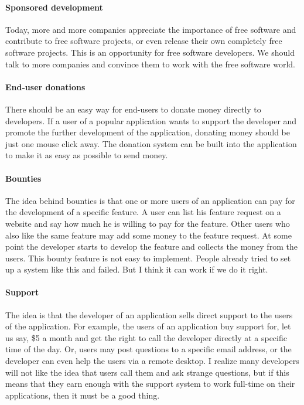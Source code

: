\paragraph*{Sponsored development}

Today, more and more companies appreciate the importance of free software and contribute to free software projects, or even release their own completely free software projects. This is an opportunity for free software developers. We should talk to more companies and convince them to work with the free software world. 

\paragraph*{End-user donations}

There should be an easy way for end-users to donate money directly to developers. If a user of a popular application wants to support the developer and promote the further development of the application, donating money should be just one mouse click away. The donation system can be built into the application to make it as easy as possible to send money.

\paragraph*{Bounties}

The idea behind bounties is that one or more users of an application can pay for the development of a specific feature. A user can list his feature request on a website and say how much he is willing to pay for the feature. Other users who also like the same feature may add some money to the feature request. At some point the developer starts to develop the feature and collects the money from the users. This bounty feature is not easy to implement. People already tried to set up a system like this and failed. But I think it can work if we do it right. 

\paragraph*{Support}

The idea is that the developer of an application sells direct support to the users of the application. For example, the users of an application buy support for, let us say, \$5 a month and get the right to call the developer directly at a specific time of the day. Or, users may post questions to a specific email address, or the developer can even help the users via a remote desktop. I realize many developers will not like the idea that users call them and ask strange questions, but if this means that they earn enough with the support system to work full-time on their applications, then it must be a good thing.

